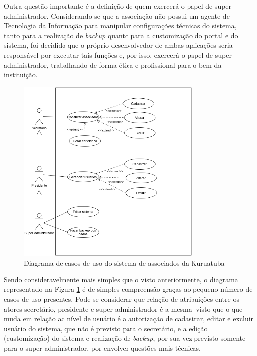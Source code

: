 Outra questão importante é a definição de quem exercerá o papel de super administrador. Considerando-se que a associação não possui um agente de Tecnologia da Informação para manipular configurações técnicas do sistema, tanto para a realização de \textit{backup} quanto para a customização do portal e do sistema, foi decidido que o próprio desenvolvedor de ambas aplicações seria responsável por executar tais funções e, por isso, exercerá o papel de super administrador, trabalhando de forma ética e profissional para o bem da instituição.

\begin{figure}[htb]
 \centering
 \caption{Diagrama de casos de uso do sistema de associados da Kuruatuba}
 \includegraphics[width=0.8\textwidth]{figuras/use-case-sistema.png}
 
 \label{use-case-sistema}
\end{figure}

Sendo consideravelmente mais simples que o visto anteriormente, o diagrama representado na Figura \ref{use-case-sistema} é de simples compreensão graças ao pequeno número de casos de uso presentes. Pode-se considerar que relação de atribuições entre os atores secretário,  presidente e super administrador é a mesma, visto que o que muda em relação ao nível de usuário é a autorização de cadastrar, editar e excluir usuário do sistema, que não é previsto para o secretário, e a edição (customização) do sistema e realização de \textit{backup}, por sua vez previsto somente para o super administrador, por envolver questões mais técnicas.

